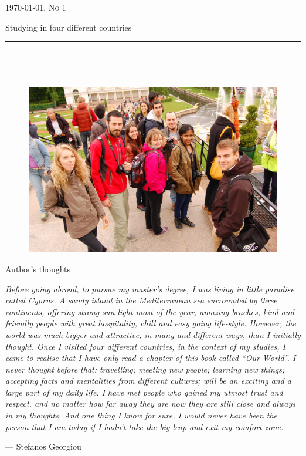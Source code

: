 \documentclass[10pt,a4paper]{article} %
\newcommand{\HorRule}[1]{\noindent\rule{\linewidth}{#1}} %
\newcommand{\SepRule}{\noindent	%
\begin{center}
\rule{250pt}{1pt} %
\end{center}
}
\newcommand{\NewsletterName}[1]{ %
\begin{center}
\Huge \usefont{T1}{fvs}{b}{n} %
#1
\end{center}	
\par \normalsize \normalfont}
\newcommand{\JournalIssue}[1]{ %
\hfill \textsc{\mydate \today, No #1} %
\par \normalsize \normalfont}
\newcommand{\NewsItem}[1]{ %
\usefont{T1}{fvs}{n}{n} %
\vspace{24pt}\large #1\vspace{3pt} %
\par \normalsize \normalfont}
\begin{document}
\JournalIssue{1} %

\NewsletterName{Studying in four different countries} %

\noindent\HorRule{3pt} \\[-0.75\baselineskip] %
\HorRule{1pt} %


\vspace{0.5cm}
\SepRule
\vspace{-0.5cm}

\begin{center}
\begin{minipage}[h]{0.75\linewidth}
\begin{figure}
\includegraphics[width=0.45 \textwidth]{media/front_picture.jpg}
\\
\end{figure}
	
\NewsItem{Author's thoughts} %
\vspace{3pt} %
\textit{
Before going abroad, to pursue my master's degree, I was living in little 
paradise called Cyprus. 
A sandy island in the Mediterranean sea surrounded by three continents, 
offering strong sun light most of the year, amazing beaches, kind and friendly people 
with great hospitality, chill and easy going life-style. 
However, the world was much bigger and attractive, in many and different ways, than 
I initially thought.
Once I visited four different countries, in the context of my studies, I came to 
realise that I have only read a chapter of this book called ``Our World''. 
I never thought before that: travelling; meeting new people; learning new things; 
accepting facts and mentalities from different cultures; will be an exciting and 
a large part of my daily life. 
I have met people who gained my utmost trust and respect, and no matter how far 
away they are now they are still close and always in my thoughts.   
And one thing I know for sure, I would never have been the person that I am today 
if I hadn't take the big leap and exit my comfort zone.
}
\par\hfill --- Stefanos Georgiou
\end{minipage}
\end{center}
\end{document}
